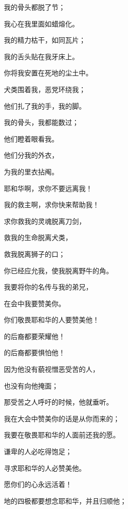 {\par }{\Q 我的骨头都脱了节；
\par }{\Q 我心在我里面如蜡熔化。
\par }{\Q {}我的精力枯干，如同瓦片；
\par }{\Q 我的舌头贴在我牙床上。
\par }{\Q 你将我安置在死地的尘土中。
\par }{\BB \par }{\Q {}犬类围着我，恶党环绕我；
\par }{\Q 他们扎了我的手，我的脚。
\par }{\Q {}我的骨头，我都能数过；
\par }{\Q 他们瞪着眼看我。
\par }{\Q {}他们分我的外衣，
\par }{\Q 为我的里衣拈阄。
\par }{\BB \par }{\Q {}耶和华啊，求你不要远离我！
\par }{\Q 我的救主啊，求你快来帮助我！
\par }{\Q {}求你救我的灵魂脱离刀剑，
\par }{\Q 救我的生命脱离犬类，
\par }{\Q {}救我脱离狮子的口；
\par }{\Q 你已经应允我，使我脱离野牛的角。
\par }{\BB \par }{\Q {}我要将你的名传与我的弟兄，
\par }{\Q 在会中我要赞美你。
\par }{\Q {}你们敬畏耶和华的人要赞美他！
\par }{的后裔都要荣耀他！
\par }{的后裔都要惧怕他！
\par }{\Q {}因为他没有藐视憎恶受苦的人，
\par }{\Q 也没有向他掩面；
\par }{\Q 那受苦之人呼吁的时候，他就垂听。
\par }{\BB \par }{\Q {}我在大会中赞美你的话是从你而来的；
\par }{\Q 我要在敬畏耶和华的人面前还我的愿。
\par }{\Q {}谦卑的人必吃得饱足；
\par }{\Q 寻求耶和华的人必赞美他。
\par }{\Q 愿你们的心永远活着！
\par }{\BB \par }{\Q {}地的四极都要想念耶和华，并且归顺他；
}
